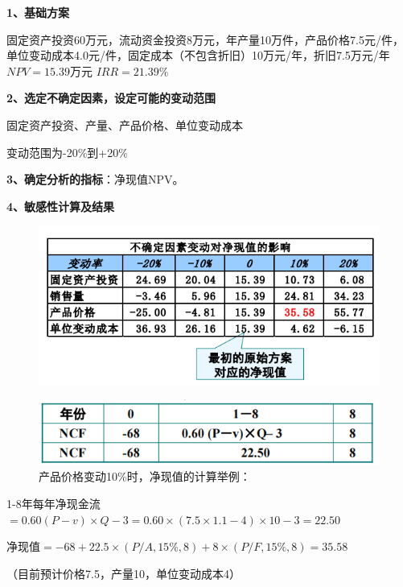 \textbf{1、基础方案}

固定资产投资60万元，流动资金投资8万元，年产量10万件，产品价格7.5元/件，单位变动成本4.0元/件，固定成本（不包含折旧）10万元/年，折旧7.5万元/年
$NPV=15.39$万元
$IRR=21.39\%$

\textbf{2、选定不确定因素，设定可能的变动范围}

固定资产投资、产量、产品价格、单位变动成本

变动范围为-20\%到+20\%

\textbf{3、确定分析的指标}：净现值NPV。

\textbf{4、敏感性计算及结果}

\begin{figure}[H]
    \centering
    \includegraphics[width=1\linewidth]{image/不确定因素变动对净现值的影响.png}
\end{figure}

\begin{figure}[H]
    \centering
    \caption{产品价格变动10\%时，净现值的计算举例：}
    \includegraphics[width=0.85\linewidth]{image/净现值的计算举例.png}
\end{figure}

1-8年每年净现金流$= 0.60 (P-v) \times Q - 3 = 0.60 \times (7.5 \times 1.1 - 4) \times 10 - 3 = 22.50$

净现值$=-68+22.5 \times (P/A,15\%,8)+8 \times (P/F,15\%,8) = 35.58$

（目前预计价格7.5，产量10，单位变动成本4）

